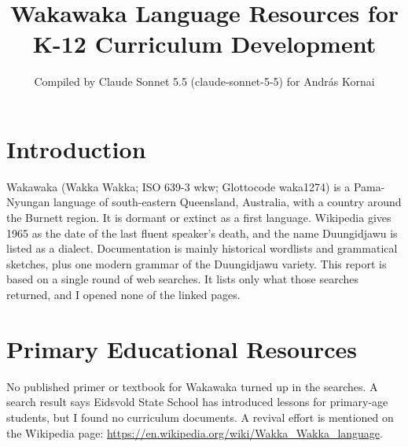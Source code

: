 \documentclass[12pt]{article}
\title{Wakawaka Language Resources for K-12 Curriculum Development}
\author{Compiled by Claude Sonnet 5.5 (claude-sonnet-5-5) for Andr\'as Kornai}
\date{}
\begin{document}
\maketitle

\section{Introduction}
Wakawaka (Wakka Wakka; ISO 639-3 wkw; Glottocode waka1274) is a Pama-Nyungan language of south-eastern Queensland, Australia, with a country around the Burnett region. It is dormant or extinct as a first language. Wikipedia gives 1965 as the date of the last fluent speaker's death, and the name Duungidjawu is listed as a dialect. Documentation is mainly historical wordlists and grammatical sketches, plus one modern grammar of the Duungidjawu variety. This report is based on a single round of web searches. It lists only what those searches returned, and I opened none of the linked pages.

\section{Primary Educational Resources}
No published primer or textbook for Wakawaka turned up in the searches. A search result says Eidsvold State School has introduced lessons for primary-age students, but I found no curriculum documents. A revival effort is mentioned on the Wikipedia page: \url{https://en.wikipedia.org/wiki/Wakka_Wakka_language}.
\end{document}
